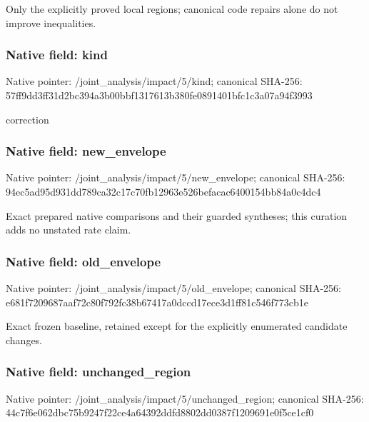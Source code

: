 \documentclass[10pt,a4paper]{article}
\begin{document}
\begingroup\raggedright\sloppy Only the explicitly proved local regions;\allowbreak{} canonical code repairs alone do not improve inequalities.\par\endgroup

\subsubsection{Native field: kind}
Native pointer: /joint\_\allowbreak{}analysis/impact/5/kind; canonical SHA-256: 57ff9dd3ff31d2bc394a3b00bbf1317613b380fe0891401bfc1c3a07a94f3993

\begingroup\raggedright\sloppy correction\par\endgroup

\subsubsection{Native field: new\_\allowbreak{}envelope}
Native pointer: /joint\_\allowbreak{}analysis/impact/5/new\_\allowbreak{}envelope; canonical SHA-256: 94ec5ad95d931dd789ca32c17c70fb12963e526befacac6400154bb84a0c4dc4

\begingroup\raggedright\sloppy Exact prepared native comparisons and their guarded syntheses;\allowbreak{} this curation adds no unstated rate claim.\par\endgroup

\subsubsection{Native field: old\_\allowbreak{}envelope}
Native pointer: /joint\_\allowbreak{}analysis/impact/5/old\_\allowbreak{}envelope; canonical SHA-256: e681f7209687aaf72c80f792fc38b67417a0dccd17ece3d1ff81c546f773cb1e

\begingroup\raggedright\sloppy Exact frozen baseline,\allowbreak{} retained except for the explicitly enumerated candidate changes.\par\endgroup

\subsubsection{Native field: unchanged\_\allowbreak{}region}
Native pointer: /joint\_\allowbreak{}analysis/impact/5/unchanged\_\allowbreak{}region; canonical SHA-256: 44c7f6e062dbc75b9247f22ce4a64392ddfd8802dd0387f1209691e0f5ce1cf0
\end{document}
